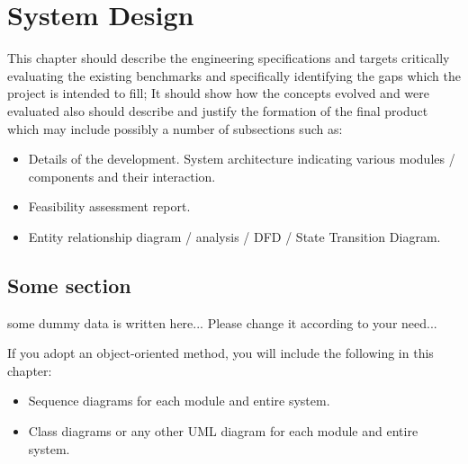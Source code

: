 
\chapter{System Design}
This chapter should describe the engineering specifications and targets critically evaluating the existing benchmarks and specifically identifying the gaps which the project is intended to fill; It should show how the concepts evolved and were evaluated also should describe and justify the formation of the final product which may include possibly a number of subsections such as:


\begin{itemize}
	\item Details of the development.  System architecture indicating various modules / components and their interaction.
	\item Feasibility assessment report. 
	\item Entity relationship diagram / analysis / DFD / State Transition Diagram.
\end{itemize}

\section{Some section}
some dummy data is written here... Please change it according to your need...

If you adopt an object-oriented method, you will include the following in this chapter:

\begin{itemize}
	\item Sequence diagrams for each module and entire system.
	\item Class diagrams or any other UML diagram for each module and entire system.
\end{itemize}